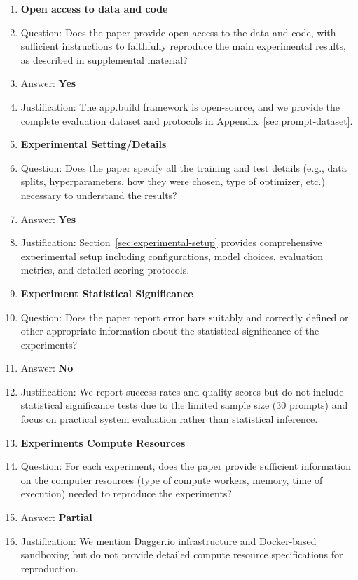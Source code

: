 \documentclass{article}
\begin{document}
\begin{enumerate}
\item {\bf Open access to data and code}
    \item[] Question: Does the paper provide open access to the data and code, with sufficient instructions to faithfully reproduce the main experimental results, as described in supplemental material?
    \item[] Answer: \textbf{Yes}
    \item[] Justification: The app.build framework is open-source, and we provide the complete evaluation dataset and protocols in Appendix~\ref{sec:prompt-dataset}.

\item {\bf Experimental Setting/Details}
    \item[] Question: Does the paper specify all the training and test details (e.g., data splits, hyperparameters, how they were chosen, type of optimizer, etc.) necessary to understand the results?
    \item[] Answer: \textbf{Yes}
    \item[] Justification: Section~\ref{sec:experimental-setup} provides comprehensive experimental setup including configurations, model choices, evaluation metrics, and detailed scoring protocols.

\item {\bf Experiment Statistical Significance}
    \item[] Question: Does the paper report error bars suitably and correctly defined or other appropriate information about the statistical significance of the experiments?
    \item[] Answer: \textbf{No}
    \item[] Justification: We report success rates and quality scores but do not include statistical significance tests due to the limited sample size (30 prompts) and focus on practical system evaluation rather than statistical inference.

\item {\bf Experiments Compute Resources}
    \item[] Question: For each experiment, does the paper provide sufficient information on the computer resources (type of compute workers, memory, time of execution) needed to reproduce the experiments?
    \item[] Answer: \textbf{Partial}
    \item[] Justification: We mention Dagger.io infrastructure and Docker-based sandboxing but do not provide detailed compute resource specifications for reproduction.


\end{enumerate}
\end{document}
